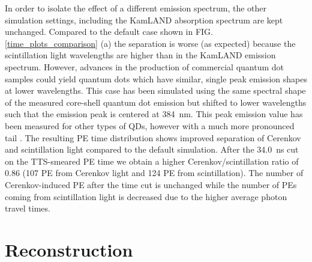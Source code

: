 \documentclass[aps,prc,twocolumn,groupedaddress,showpacs,amsmath,amssymb,floatfix,superscriptaddress]{revtex4}
\begin{document}
In order to isolate the effect of a different emission spectrum, the other simulation settings, including the KamLAND absorption spectrum are kept unchanged. Compared to the default case shown in FIG. \ref{time_plots_comparison} (a) the separation is worse (as expected) because the scintillation light wavelengths are higher than in the KamLAND emission spectrum. However, advances in the production of commercial quantum dot samples could yield quantum dots which have similar, single peak emission shapes at lower wavelengths. This case has been simulated using the same spectral shape of the measured core-shell quantum dot emission but shifted to lower wavelengths such that the emission peak is centered at 384~nm. This peak emission value has been measured for other types of QDs, however with a much more pronounced tail \cite{qdot2}. The resulting PE time distribution shows improved separation of Cerenkov and scintillation light compared to the default simulation. After the 34.0~ns cut on the TTS-smeared PE time we obtain a higher Cerenkov/scintillation ratio of 0.86 (107 PE from Cerenkov light and 124 PE from scintillation). The number of Cerenkov-induced PE after the time cut is unchanged while the number of PEs coming from scintillation light is decreased due to the higher average photon travel times. 

\section{Reconstruction}
\label{reconstruction_sec}
\end{document}
